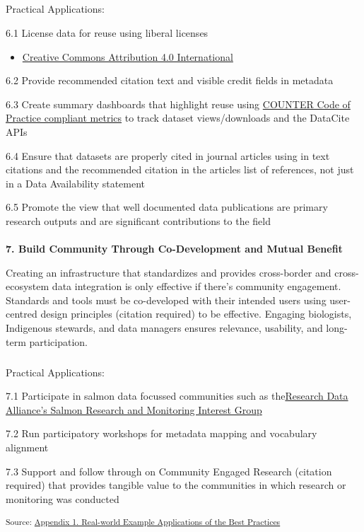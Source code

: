 \documentclass[
  letterpaper,
  DIV=11,
  numbers=noendperiod]{scrartcl}
\makeatletter
\let\oldparagraph\paragraph
\renewcommand{\paragraph}{
    \@ifstar
      \xxxParagraphStar
      \xxxParagraphNoStar
  }
\newcommand{\xxxParagraphStar}[1]{\oldparagraph*{#1}\mbox{}}
\newcommand{\xxxParagraphNoStar}[1]{\oldparagraph{#1}\mbox{}}
\let\oldsubparagraph\subparagraph
\renewcommand{\subparagraph}{
    \@ifstar
      \xxxSubParagraphStar
      \xxxSubParagraphNoStar
  }
\newcommand{\xxxSubParagraphStar}[1]{\oldsubparagraph*{#1}\mbox{}}
\newcommand{\xxxSubParagraphNoStar}[1]{\oldsubparagraph{#1}\mbox{}}
\providecommand{\tightlist}{%
  \setlength{\itemsep}{0pt}\setlength{\parskip}{0pt}}\usepackage{longtable,booktabs,array}
\makeatother
\begin{document}
\subparagraph{Practical Applications:}\label{practical-applications-5}

6.1 License data for reuse using liberal licenses

\begin{itemize}
\tightlist
\item
  \href{https://creativecommons.org/licenses/by/4.0/deed.en}{Creative
  Commons Attribution 4.0 International}
\end{itemize}

6.2 Provide recommended citation text and visible credit fields in
metadata

6.3 Create summary dashboards that highlight reuse using
\href{https://www.countermetrics.org/}{COUNTER Code of Practice
compliant metrics} to track dataset views/downloads and the DataCite
APIs

6.4 Ensure that datasets are properly cited in journal articles using in
text citations and the recommended citation in the articles list of
references, not just in a Data Availability statement

6.5 Promote the view that well documented data publications are primary
research outputs and are significant contributions to the field

\paragraph{\texorpdfstring{\textbf{7. Build Community Through
Co-Development and Mutual
Benefit}}{7. Build Community Through Co-Development and Mutual Benefit}}\label{build-community-through-co-development-and-mutual-benefit}

Creating an infrastructure that standardizes and provides cross-border
and cross-ecosystem data integration is only effective if there's
community engagement. Standards and tools must be co-developed with
their intended users using user-centred design principles (citation
required) to be effective. Engaging biologists, Indigenous stewards, and
data managers ensures relevance, usability, and long-term participation.

\subparagraph{Practical Applications:}\label{practical-applications-6}

7.1 Participate in salmon data focussed communities such as
the\href{https://www.rd-alliance.org/groups/salmon-research-and-monitoring-ig/}{Research
Data Alliance's Salmon Research and Monitoring Interest Group}~

7.2 Run participatory workshops for metadata mapping and vocabulary
alignment

7.3 Support and follow through on Community Engaged Research (citation
required) that provides tangible value to the communities in which
research or monitoring was conducted

\textsubscript{Source:
\href{https://br-johnson.github.io/sdm-paper/appendices/appendix-1-real-world-examples-preview.html\#66084a22-a98a-403f-a2df-dba8c69a7a0d}{Appendix
1. Real-world Example Applications of the Best Practices}}
\end{document}
